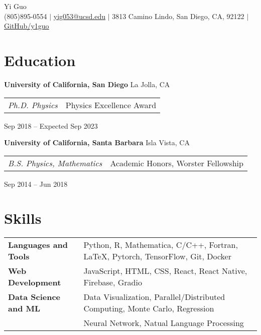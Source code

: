 \documentclass[letterpaper,12pt]{article}
\begin{document}
\newcommand{\name}{Yi Guo}
\newcommand{\phone}{(805)895-0554}
\newcommand{\email}{yig053@ucsd.edu}
\newcommand{\address}{3813 Camino Lindo, San Diego, CA, 92122}
\newcommand{\github}{y1guo}
\newcommand{\linkedin}{y1guo}
\newcommand{\website}{https://y1guo.github.io}

\begin{center}
    \Huge \name \\
    \vspace{1pt}
    \small \phone 
    $|$ \href{mailto:\email}{\underline{\email}} 
    $|$ \address
    $|$ \href{https://github.com/\github}{\underline{GitHub/\github}} 
    \vspace{-15pt}
\end{center}


\section{Education}

\textbf{University of California, San Diego} \hfill La Jolla, CA \\
\begin{tabular}{p{12em} p{20em}}
    \textit{Ph.D. Physics} 
    & Physics Excellence Award 
\end{tabular}
\hfill Sep 2018 -- Expected Sep 2023

\textbf{University of California, Santa Barbara} \hfill Isla Vista, CA \\
\begin{tabular}{p{12em} p{20em}}
    \textit{B.S. Physics, Mathematics}
    & Academic Honors, Worster Fellowship
\end{tabular}
\hfill Sep 2014 -- Jun 2018


\section{Skills}

\begin{tabular}{p{10em} p{33em}}
    \textbf{Languages and Tools} 
    & Python, R, Mathematica, C/C++, Fortran, \LaTeX, Pytorch, TensorFlow, Git, Docker \\
    \textbf{Web Development}
    & JavaScript, HTML, CSS, React, React Native, Firebase, Gradio \\
    \textbf{Data Science and ML} 
    & Data Visualization, Parallel/Distributed Computing, Monte Carlo, Regression \\
    & Neural Network, Natual Language Processing
\end{tabular}
\end{document}
